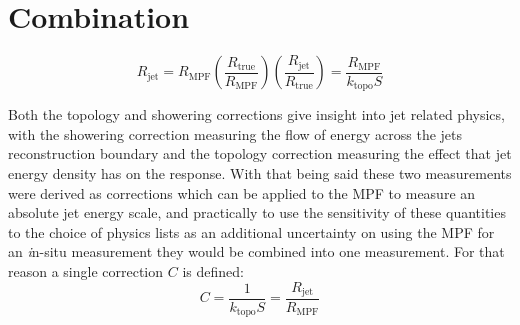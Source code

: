

\section{Combination}

\begin{equation}
  R_{\mathrm{jet}} = R_{\mathrm{MPF}}\left(\frac{R_{\mathrm{true}}}{R_{\mathrm{MPF}}}\right)\left(\frac{R_{\mathrm{jet}}}{R_{\mathrm{true}}}\right) = \frac{R_{\mathrm{MPF}}}{k_{\mathrm{topo}}S}
\end{equation}

Both the topology and showering corrections give insight into jet related physics, with the showering correction measuring the flow of energy across the jets reconstruction boundary and the topology correction measuring the effect that jet energy density has on the response.  
With that being said these two measurements were derived as corrections which can be applied to the MPF to measure an absolute jet energy scale, and practically to use the sensitivity of these quantities to the choice of physics lists as an additional uncertainty on using the MPF for an {\textit in-situ} measurement they would be combined into one measurement.  
For that reason a single correction $C$ is defined:
\begin{equation}
  C = \frac{1}{k_{\mathrm{topo}}S} = \frac{R_{\mathrm{jet}}}{R_{\mathrm{MPF}}}
  \label{EQ:CorrC}
\end{equation}

